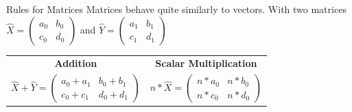 \documentclass{beamer}
\begin{document}
\begin{frame}{Rules for Matrices}
    Matrices behave quite similarly to vectors.\vfill
    With two matrices $\hat{X} = \begin{pmatrix}a_0 & b_0 \\ c_0 & d_0 \end{pmatrix} $ and $\hat{Y} = \begin{pmatrix}a_1 & b_1 \\ c_1 & d_1 \end{pmatrix} $\vfill

    \centering
    \begin{tabular}{c | c}
        \textbf{Addition} & \textbf{Scalar Multiplication}\\[2ex]
        \begin{math}
            \hat{X}+\hat{Y} = \begin{pmatrix}
                a_0+a_1 & b_0+b_1 \\
                c_0 + c_1 & d_0+d_1
            \end{pmatrix}
        \end{math} & \begin{math}
            n * \hat{X} = \begin{pmatrix}
                n * a_0 & n * b_0 \\
                n * c_0 & n * d_0 
            \end{pmatrix}
        \end{math}\\
    \end{tabular}
    
\end{frame}
\end{document}
